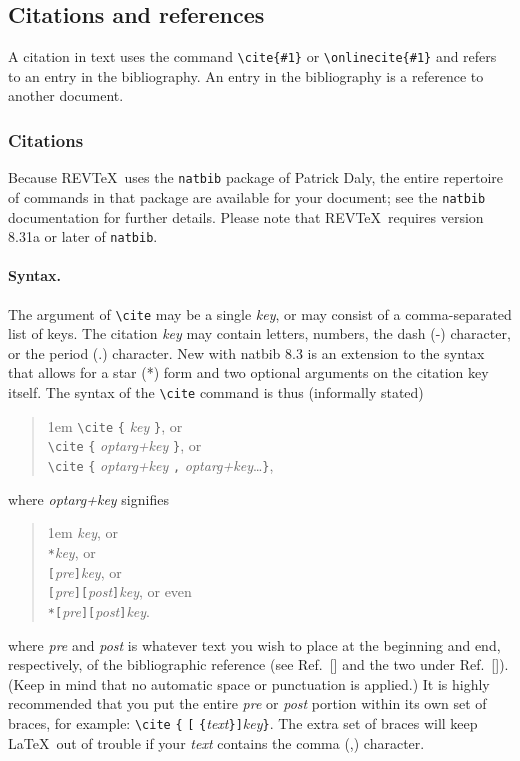 \documentclass[%
 preprint, linenumbers,
 amsmath,amssymb,
 aps, physrev,
]{revtex4-2}
\begin{document}
\subsection{\label{sec:citeref}Citations and references}
A citation in text uses the command \verb+\cite{#1}+ or
\verb+\onlinecite{#1}+ and refers to an entry in the bibliography. 
An entry in the bibliography is a reference to another document.

\subsubsection{Citations}
Because REV\TeX\ uses the \verb+natbib+ package of Patrick Daly, 
the entire repertoire of commands in that package are available for your document;
see the \verb+natbib+ documentation for further details. Please note that
REV\TeX\ requires version 8.31a or later of \verb+natbib+.

\paragraph{Syntax.}
The argument of \verb+\cite+ may be a single \emph{key}, 
or may consist of a comma-separated list of keys.
The citation \emph{key} may contain 
letters, numbers, the dash (-) character, or the period (.) character. 
New with natbib 8.3 is an extension to the syntax that allows for 
a star (*) form and two optional arguments on the citation key itself.
The syntax of the \verb+\cite+ command is thus (informally stated)
\begin{quotation}\flushleft\leftskip1em
\verb+\cite+ \verb+{+ \emph{key} \verb+}+, or\\
\verb+\cite+ \verb+{+ \emph{optarg+key} \verb+}+, or\\
\verb+\cite+ \verb+{+ \emph{optarg+key} \verb+,+ \emph{optarg+key}\ldots \verb+}+,
\end{quotation}\noindent
where \emph{optarg+key} signifies 
\begin{quotation}\flushleft\leftskip1em
\emph{key}, or\\
\texttt{*}\emph{key}, or\\
\texttt{[}\emph{pre}\texttt{]}\emph{key}, or\\
\texttt{[}\emph{pre}\texttt{]}\texttt{[}\emph{post}\texttt{]}\emph{key}, or even\\
\texttt{*}\texttt{[}\emph{pre}\texttt{]}\texttt{[}\emph{post}\texttt{]}\emph{key}.
\end{quotation}\noindent
where \emph{pre} and \emph{post} is whatever text you wish to place 
at the beginning and end, respectively, of the bibliographic reference
(see Ref.~[] and the two under Ref.~[]).
(Keep in mind that no automatic space or punctuation is applied.)
It is highly recommended that you put the entire \emph{pre} or \emph{post} portion 
within its own set of braces, for example: 
\verb+\cite+ \verb+{+ \texttt{[} \verb+{+\emph{text}\verb+}+\texttt{]}\emph{key}\verb+}+.
The extra set of braces will keep \LaTeX\ out of trouble if your \emph{text} contains the comma (,) character.
\end{document}
